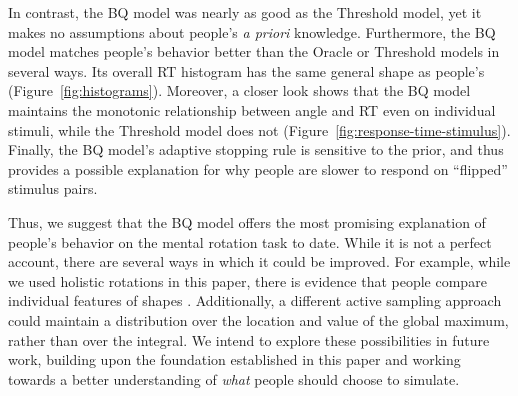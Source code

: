 \documentclass[10pt,letterpaper]{article}
\newcommand{\Oc}[0]{Oracle}
\newcommand{\Th}[0]{Threshold}
\newcommand{\Bq}[0]{BQ}
\begin{document}
In contrast, the \Bq{} model was nearly as good as the \Th{} model,
yet it makes no assumptions about people's \textit{a priori}
knowledge. Furthermore, the \Bq{} model matches people's behavior
better than the \Oc{} or \Th{} models in several ways. Its overall RT
histogram has the same general shape as people's
(Figure~\ref{fig:histograms}).  Moreover, a closer look shows that the
\Bq{} model maintains the monotonic relationship between angle and RT
even on individual stimuli, while the \Th{} model does not
(Figure~\ref{fig:response-time-stimulus}). Finally, the \Bq{} model's
adaptive stopping rule is sensitive to the prior, and thus provides a
possible explanation for why people are slower to respond on
``flipped'' stimulus pairs.

Thus, we suggest that the \Bq{} model offers the most promising
explanation of people's behavior on the mental rotation task to
date. While it is not a perfect account, there are several ways in
which it could be improved. For example, while we used holistic
rotations in this paper, there is evidence that people compare
individual features of shapes
\cite{Just1976,Yuille:1982tx}. Additionally, a different active
sampling approach could maintain a distribution over the location and
value of the global maximum, rather than over the integral. We intend
to explore these possibilities in future work, building upon the
foundation established in this paper and working towards a better
understanding of \textit{what} people should choose to simulate.





\renewcommand{\bibliographytypesize}{\small}
\setlength{\bibleftmargin}{.125in}
\setlength{\bibindent}{-\bibleftmargin}

\end{document}
